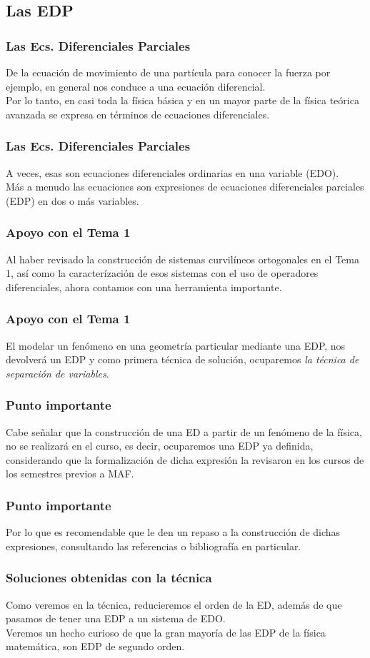 \subsection{Las EDP}
\begin{frame}
\frametitle{Las Ecs. Diferenciales Parciales}
De la ecuación de movimiento de una partícula para conocer la fuerza por ejemplo, en general nos conduce a una ecuación diferencial.
\\
\bigskip
Por lo tanto, en casi toda la física  básica y en un mayor parte de la física teórica avanzada se expresa en términos de ecuaciones diferenciales.
\end{frame}
\begin{frame}
\frametitle{Las Ecs. Diferenciales Parciales}
A veces, esas son ecuaciones diferenciales ordinarias en una variable (EDO).
\\
\bigskip
Más a menudo las ecuaciones son expresiones de ecuaciones diferenciales parciales (EDP) en dos o más variables.
\end{frame}
\begin{frame}
\frametitle{Apoyo con el Tema 1}
Al haber revisado la construcción de sistemas curvilíneos ortogonales en el Tema 1, así como la caracterízación de esos sistemas con el uso de operadores diferenciales, ahora contamos con una herramienta importante.
\end{frame}
\begin{frame}
\frametitle{Apoyo con el Tema 1}
El modelar un fenómeno en una geometría particular mediante una EDP, nos devolverá un EDP y como primera técnica de solución, ocuparemos \emph{la técnica de separación de variables}.
\end{frame}
\begin{frame}
\frametitle{Punto importante}
Cabe señalar que la construcción de una ED a partir de un fenómeno de la física, no se realizará en el curso, es decir, ocuparemos una EDP ya definida, considerando que la formalización de dicha expresión la revisaron en los cursos de los semestres previos a MAF.
\end{frame}
\begin{frame}
\frametitle{Punto importante}
Por lo que es recomendable que le den un repaso a la construcción de dichas expresiones, consultando las referencias o bibliografía en particular.
\end{frame}
\begin{frame}
\frametitle{Soluciones obtenidas con la técnica}
Como veremos en la técnica, reducieremos el orden de la ED, además de que pasamos de tener una EDP a un sistema de EDO.
\\
\bigskip
Veremos un hecho curioso de que la gran mayoría de las EDP de la física matemática, son EDP de segundo orden.
\end{frame}
